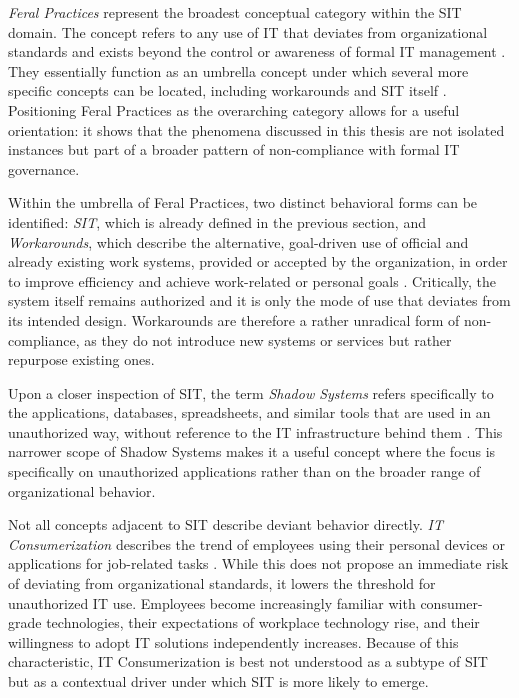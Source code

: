 \documentclass[12pt,oneside]{article}
\begin{document}
\textit{Feral Practices} represent the broadest conceptual category within the \ac{SIT} domain. The concept refers to any use of \ac{IT} that deviates from organizational standards and exists beyond the control or awareness of formal \ac{IT} management \citep[2]{thatte2012feral}. They essentially function as an umbrella concept under which several more specific concepts can be located, including workarounds and \ac{SIT} itself \citep[3]{kopper2016towards}. Positioning Feral Practices as the overarching category allows for a useful orientation: it shows that the phenomena discussed in this thesis are not isolated instances but part of a broader pattern of non-compliance with formal \ac{IT} governance.

Within the umbrella of Feral Practices, two distinct behavioral forms can be identified: \textit{\ac{SIT}}, which is already defined in the previous section, and \textit{Workarounds}, which describe the alternative, goal-driven use of official and already existing work systems, provided or accepted by the organization, in order to improve efficiency and achieve work-related or personal goals \citep[1044]{alter2014theory}. Critically, the system itself remains authorized and it is only the mode of use that deviates from its intended design. Workarounds are therefore a rather unradical form of non-compliance, as they do not introduce new systems or services but rather repurpose existing ones.

Upon a closer inspection of \ac{SIT}, the term \textit{Shadow Systems} refers specifically to the applications, databases, spreadsheets, and similar tools that are used in an unauthorized way, without reference to the \ac{IT} infrastructure behind them \citep[5]{kopper2016towards}. This narrower scope of Shadow Systems makes it a useful concept where the focus is specifically on unauthorized applications rather than on the broader range of organizational behavior.

Not all concepts adjacent to \ac{SIT} describe deviant behavior directly. \textit{IT Consumerization} describes the trend of employees using their personal devices or applications for job-related tasks \citep[847]{klesel2019employees}. While this does not propose an immediate risk of deviating from organizational standards, it lowers the threshold for unauthorized \ac{IT} use. Employees become increasingly familiar with consumer-grade technologies, their expectations of workplace technology rise, and their willingness to adopt \ac{IT} solutions independently increases. Because of this characteristic, \ac{IT} Consumerization is best not understood as a subtype of \ac{SIT} but as a contextual driver under which \ac{SIT} is more likely to emerge.
\end{document}
